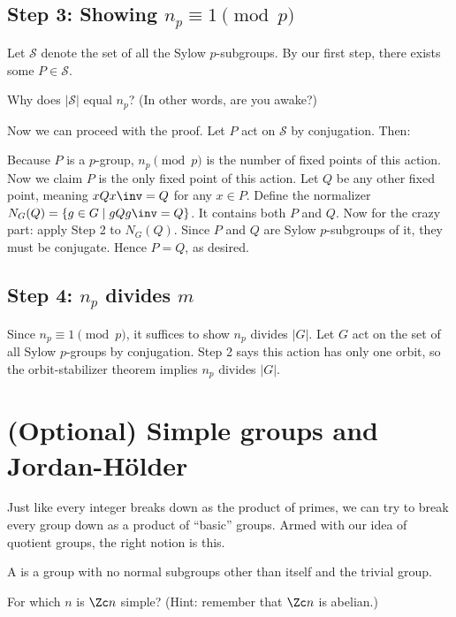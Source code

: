 \subsection{Step 3: Showing $n_p \equiv 1 \pmod p$}
Let $\mathcal S$ denote the set of all the Sylow $p$-subgroups. By our
first step, there exists some $P \in \mathcal S$.
\begin{ques}
	Why does $\left\lvert \mathcal S \right\rvert$ equal $n_p$?
	(In other words, are you awake?)
\end{ques}
Now we can proceed with the proof. Let $P$ act on $\mathcal S$ by
conjugation. Then:
\begin{itemize}
	\ii Because $P$ is a $p$-group, $n_p \pmod p$ is the number of fixed points
	of this action.
	Now we claim $P$ is the only fixed point of this action.
	\ii Let $Q$ be any other fixed point, meaning $xQx\inv = Q$ for any $x \in P$.
	\ii Define the normalizer $N_G(Q) = \left\{ g \in G \mid gQg\inv = Q \right\}$.  It contains both $P$ and $Q$.
	\ii Now for the crazy part: apply Step 2 to $N_G(Q)$.
	Since $P$ and $Q$ are Sylow $p$-subgroups of it, they must be conjugate.
	\ii Hence $P=Q$, as desired.
\end{itemize}

\subsection{Step 4: $n_p$ divides $m$}
Since $n_p \equiv 1 \pmod p$, it suffices to show $n_p$ divides $\left\lvert G \right\rvert$.
Let $G$ act on the set of all Sylow $p$-groups by conjugation.
Step 2 says this action has only one orbit, so the orbit-stabilizer theorem
implies $n_p$ divides $\left\lvert G \right\rvert$.


\section{(Optional) Simple groups and Jordan-H\"older}
Just like every integer breaks down as the product of primes,
we can try to break every group down as a product of ``basic'' groups.
Armed with our idea of quotient groups, the right notion is this.

\begin{definition}
	A  is a group with no normal subgroups
	other than itself and the trivial group.
\end{definition}
\begin{ques}
	For which $n$ is $\Zc n$ simple? (Hint: remember that $\Zc n$ is abelian.)
\end{ques}

